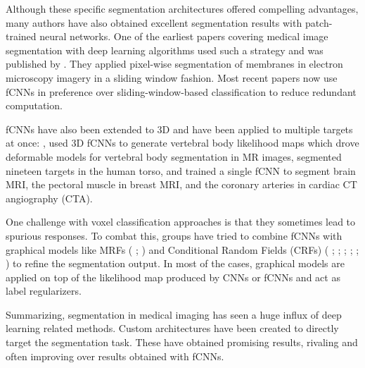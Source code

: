 \documentclass{nitk}
\begin{document}
Although these specific segmentation architectures offered
compelling advantages, many authors have also obtained excellent segmentation results with patch-trained neural networks. One of the earliest papers covering medical image segmentation with deep learning algorithms used such a strategy and was published by \citet{ciresan2012deep} . They applied pixel-wise segmentation of membranes in electron microscopy imagery in a sliding window fashion. Most recent papers now use fCNNs in preference over sliding-window-based classification to reduce redundant computation. \\ \par

fCNNs have also been extended to 3D and have been applied to multiple targets at once: \citet{korez2016model}, used 3D fCNNs to generate vertebral body likelihood maps which drove deformable models for vertebral body segmentation in MR images, \citet{zhou2016three} segmented nineteen targets in the human torso, and \citet{moeskops2016deep} trained a single fCNN to segment brain MRI, the pectoral muscle in breast MRI, and the coronary arteries in cardiac CT angiography (CTA). \\ \par

One challenge with voxel classification approaches is that they sometimes lead to spurious responses. To combat this, groups have tried to combine fCNNs with graphical models like MRFs ( \citet{shakeri2016sub}; \citet{song2015accurate} ) and Conditional Random Fields (CRFs) ( \citet{alansary2016fast}; \citet{cai2017pancreas}; \citet{christ2016automatic}; \citet{dou2016automatic}; \citet{fu2016deepvessel}; \citet{gao2016segmentation} ) to refine the segmentation output. In most of the cases, graphical models are applied on top of the likelihood map produced by CNNs or fCNNs and act as label regularizers. \\ \par

Summarizing, segmentation in medical imaging has seen a huge
influx of deep learning related methods. Custom architectures have been created to directly target the segmentation task. These have obtained promising results, rivaling and often improving over results obtained with fCNNs. \\ \par
\end{document}
